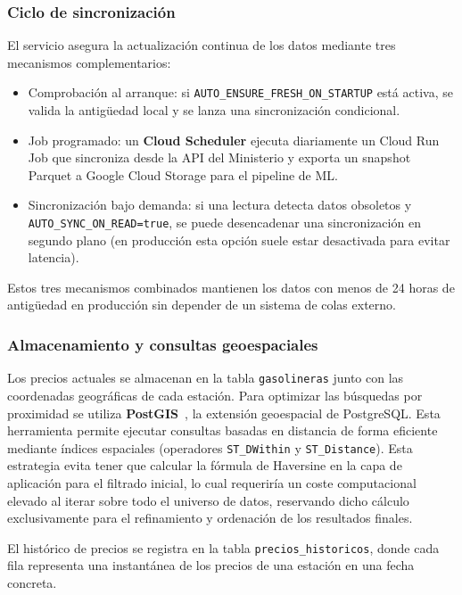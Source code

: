 \subsubsection*{Ciclo de sincronización}
El servicio asegura la actualización continua de los datos mediante tres mecanismos complementarios:

\begin{itemize}
  \item Comprobación al arranque: si \texttt{AUTO\_ENSURE\_FRESH\_ON\_STARTUP} está activa, se
        valida la antigüedad local y se lanza una sincronización condicional.
  \item Job programado: un \textbf{Cloud Scheduler} \cite{cloud_scheduler2026} ejecuta diariamente un Cloud Run Job \cite{cloud_run2026} que
        sincroniza desde la API del Ministerio y exporta un snapshot Parquet a Google Cloud
        Storage \cite{cloud_storage2026} para el pipeline de ML.
  \item Sincronización bajo demanda: si una lectura detecta datos obsoletos y
        \texttt{AUTO\_SYNC\_ON\_READ=true}, se puede desencadenar una sincronización en
        segundo plano (en producción esta opción suele estar desactivada para evitar latencia).
\end{itemize}

Estos tres mecanismos combinados mantienen los datos con menos de 24 horas de antigüedad
en producción sin depender de un sistema de colas externo.

\subsubsection*{Almacenamiento y consultas geoespaciales}

Los precios actuales se almacenan en la tabla \texttt{gasolineras} junto con las
coordenadas geográficas de cada estación. Para optimizar las búsquedas por proximidad se utiliza
\textbf{PostGIS}~\cite{postgis}, la extensión geoespacial de PostgreSQL. Esta herramienta permite
ejecutar consultas basadas en distancia de forma eficiente mediante índices espaciales
(operadores \texttt{ST\_DWithin} y \texttt{ST\_Distance}).
Esta estrategia evita tener que calcular la fórmula de Haversine en la capa de aplicación
para el filtrado inicial, lo cual requeriría un coste computacional elevado al iterar
sobre todo el universo de datos, reservando dicho cálculo exclusivamente para el refinamiento y
ordenación de los resultados finales.

El histórico de precios se registra en la tabla \texttt{precios\_historicos}, donde cada
fila representa una instantánea de los precios de una estación en una fecha concreta.

